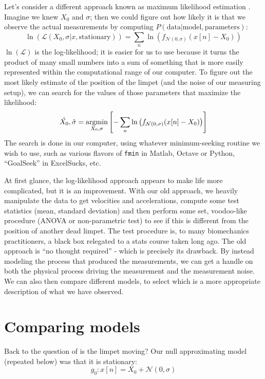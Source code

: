 Let's consider a different approach known as maximum likelihood estimation \cite{Burnham:2002, Rauch:1965}. Imagine we knew $X_0$ and $\sigma$; then we could figure out how likely it is that we observe the actual measurements by computing $P(\text{data}|\text{model},\text{parameters})$:  
\begin{equation}
\ln(\mathcal{L}(X_0,\sigma | x, \text{stationary})) = \sum_n \ln \left(f_{\mathcal{N}(0,\sigma)}(x[n]-X_0) \right)
\end{equation}
$\ln(\mathcal{L})$ is the log-likelihood; it is easier for us to use because it turns the product of many small numbers into a sum of something that is more easily represented within the computational range of our computer.  To figure out the most likely estimate of the position of the limpet (and the noise of our measuring setup), we can search for the values of those parameters that maximize the likelihood:
\begin{equation}
\hat{X_0}, \hat\sigma = \operatorname*{\arg\!\min}_{X_0, \sigma} \left[ - \sum_n \ln \left(f_{\mathcal{N}(0,\sigma)}(x[n]-X_0) \right) \right]
\label{eq:MLE}
\end{equation}
The search is done in our computer, using whatever minimum-seeking routine we wish to use, such as various flavors of \texttt{fmin} in Matlab, Octave or Python, ``GoalSeek'' in ExcelSucks, etc.  

At first glance, the log-likelihood approach appears to make life more complicated, but it is an improvement.  With our old approach, we heavily manipulate the data to get velocities and accelerations, compute some test statistics (mean, standard deviation) and then perform some set, voodoo-like procedure (ANOVA or non-parametric test) to see if this is different from the position of another dead limpet.  The test procedure is, to many biomechanics practitioners, a black box relegated to a stats course taken long ago.  The old approach is ``no thought required'' - which is precisely its drawback.  By instead modeling the process that produced the measurements, we can get a handle on both the physical process driving the measurement and the measurement noise.  We can also then compare different models, to select which is a more appropriate description of what we have observed.

\section{Comparing models}
Back to the question of is the limpet moving?  Our null approximating model (repeated below) was that it is stationary: 
\begin{equation}
g_0:  x[n] = X_0 + \mathcal{N}(0,\sigma)
\label{eq:stationary}
\end{equation}

